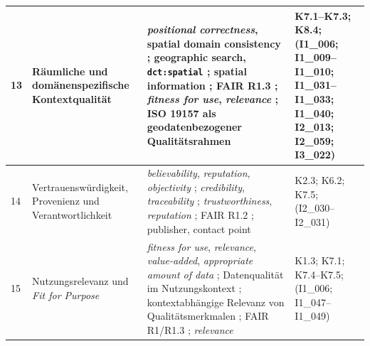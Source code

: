 \begin{center}
\begin{longtable}{p{} p{} p{} p{}}
13 &
Räumliche und domänenspezifische Kontextqualität &
\textit{positional correctness}, spatial domain consistency \cite{noguerasiso_quality_metadata}; geographic search, \texttt{dct:spatial} \cite{wentzel2023extensive,data_europa}; spatial information \cite{Neumaier2016MetadataQuality}; FAIR R1.3 \cite{wilkinson2016fair}; \textit{fitness for use}, \textit{relevance} \cite{wang1996beyond}; ISO 19157 als geodatenbezogener Qualitätsrahmen \cite{ISO19157} &
K7.1--K7.3; K8.4; (I1\_006; I1\_009--I1\_010; I1\_031--I1\_033; I1\_040; I2\_013; I2\_059; I3\_022) \\ \hline

14 &
Vertrauenswürdigkeit, Provenienz und Verantwortlichkeit &
\textit{believability}, \textit{reputation}, \textit{objectivity} \cite{wang1996beyond}; \textit{credibility}, \textit{traceability} \cite{iso25012}; \textit{trustworthiness}, \textit{reputation} \cite{Zaveri2016LinkedDataQuality}; FAIR R1.2 \cite{wilkinson2016fair}; publisher, contact point \cite{wentzel2023extensive,data_europa} &
K2.3; K6.2; K7.5; (I2\_030--I2\_031) \\ \hline

15 &
Nutzungsrelevanz und \textit{Fit for Purpose} &
\textit{fitness for use}, \textit{relevance}, \textit{value-added}, \textit{appropriate amount of data} \cite{wang1996beyond}; Datenqualität im Nutzungskontext \cite{StrongLeeWang1997}; kontextabhängige Relevanz von Qualitätsmerkmalen \cite{iso25012}; FAIR R1/R1.3 \cite{wilkinson2016fair}; \textit{relevance} \cite{Zaveri2016LinkedDataQuality} &
K1.3; K7.1; K7.4--K7.5; (I1\_006; I1\_047--I1\_049) \\

\end{longtable}
\end{center}
\normalsize
